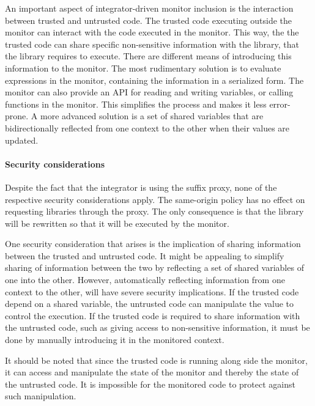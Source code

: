 \documentclass{llncs}
\newcommand{\todo}[1]{\colorbox{red}{\textcolor{white}{\sffamily\bfseries\scriptsize TODO}} \textcolor{red}{#1} \textcolor{red}{$\blacktriangleleft$}}
\begin{document}
An important aspect of integrator-driven monitor inclusion is the interaction 
between trusted and untrusted code. 
The trusted code executing outside the monitor can interact with the code 
executed in the monitor. This way, the 
the trusted code can share specific non-sensitive information with the library, 
that the library requires to execute. There are different means of introducing this 
information to the monitor. The most rudimentary solution is to evaluate 
expressions in the monitor, containing the information in a serialized form.
The monitor can also provide an API for reading and writing variables, or 
calling functions in the monitor. This simplifies the process and
makes it less error-prone. A more advanced solution is a set of shared variables
that are bidirectionally reflected from one context to the other when 
their values are updated.


\paragraph{Security considerations}

Despite the fact that the integrator is using the suffix proxy, none of the 
respective security considerations apply. The same-origin policy has no effect 
on requesting libraries through the proxy. The only consequence is that the library
will be rewritten so that it will be executed by the monitor.

One security consideration that arises is the implication of sharing information between the 
trusted and untrusted code. It might be appealing to simplify sharing of 
information between the two by reflecting a set of shared variables of one into the other.
However, automatically 
reflecting information from one context to the other, will 
have severe security implications. If the trusted code depend on a 
shared variable, the untrusted code can manipulate the value to control the
execution.
If the trusted code is required to share information 
with the untrusted code, such as giving access to non-sensitive information, it 
must be done by manually introducing it in the monitored context.

It should be noted that since the trusted code is running along side the monitor, 
it can access and manipulate the state of the monitor and thereby the state of 
the untrusted code. It is impossible for the monitored code to protect against 
such manipulation.
\end{document}
